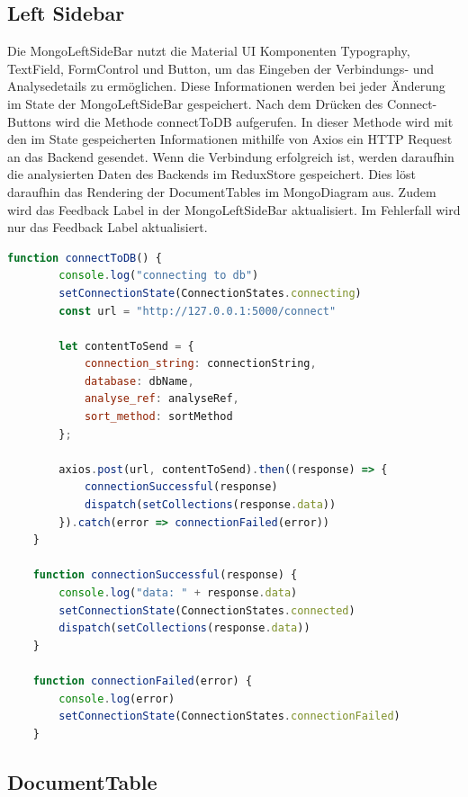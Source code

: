 \subsection{Left Sidebar}
\label{sub:fe_left_sidebar}

Die  MongoLeftSideBar nutzt die Material UI Komponenten Typography, TextField, FormControl und Button, um das Eingeben der Verbindungs- und Analysedetails zu ermöglichen.
Diese Informationen werden bei jeder Änderung im State der MongoLeftSideBar gespeichert.
Nach dem Drücken des Connect-Buttons wird die Methode connectToDB aufgerufen.
In dieser Methode wird mit den im State gespeicherten Informationen mithilfe von Axios ein HTTP Request an das Backend gesendet.
Wenn die Verbindung erfolgreich ist, werden daraufhin die analysierten Daten des Backends im ReduxStore gespeichert.
Dies löst daraufhin das Rendering der DocumentTables im MongoDiagram aus.
Zudem wird das Feedback Label in der MongoLeftSideBar aktualisiert.
Im Fehlerfall wird nur das Feedback Label aktualisiert.


\begin{lstlisting}[language=JavaScript, caption={MongoLeftSideBar.connectToDB},label={lst:mongo_left_side_bar_connect_to_db}]
    function connectToDB() {
        console.log("connecting to db")
        setConnectionState(ConnectionStates.connecting)
        const url = "http://127.0.0.1:5000/connect"

        let contentToSend = {
            connection_string: connectionString,
            database: dbName,
            analyse_ref: analyseRef,
            sort_method: sortMethod
        };

        axios.post(url, contentToSend).then((response) => {
            connectionSuccessful(response)
            dispatch(setCollections(response.data))
        }).catch(error => connectionFailed(error))
    }

    function connectionSuccessful(response) {
        console.log("data: " + response.data)
        setConnectionState(ConnectionStates.connected)
        dispatch(setCollections(response.data))
    }

    function connectionFailed(error) {
        console.log(error)
        setConnectionState(ConnectionStates.connectionFailed)
    }
\end{lstlisting}

\subsection{DocumentTable}
\label{sub:fe_document_table}

